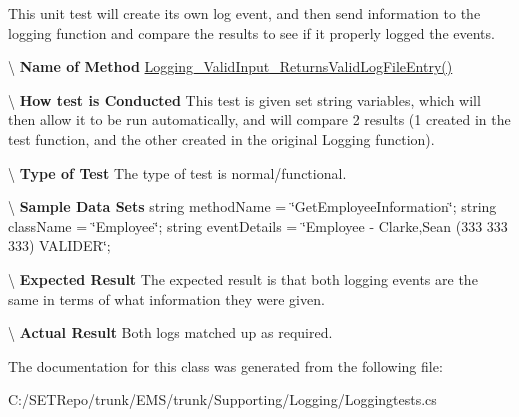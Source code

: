 This unit test will create it\textquotesingle{}s own log event, and then send information to the logging function and compare the results to see if it properly logged the events. 

\textbackslash{} {\bfseries  Name of Method} \hyperlink{class_loggingtests_1_1_loggingtests_a4a436491d1f3aed0e4402d053bed886d}{Logging\+\_\+\+Valid\+Input\+\_\+\+Returns\+Valid\+Log\+File\+Entry()}

\textbackslash{} {\bfseries  How test is Conducted} This test is given set string variables, which will then allow it to be run automatically, and will compare 2 results (1 created in the test function, and the other created in the original Logging function).

\textbackslash{} {\bfseries  Type of Test} The type of test is normal/functional.

\textbackslash{} {\bfseries  Sample Data Sets} string method\+Name = \char`\"{}\+Get\+Employee\+Information\char`\"{}; string class\+Name = \char`\"{}\+Employee\char`\"{}; string event\+Details = \char`\"{}\+Employee -\/ Clarke,\+Sean (333 333 333) V\+A\+L\+I\+D\+E\+R\char`\"{};

\textbackslash{} {\bfseries  Expected Result} The expected result is that both logging events are the same in terms of what information they were given.

\textbackslash{} {\bfseries  Actual Result} Both logs matched up as required. 

The documentation for this class was generated from the following file\+:\begin{DoxyCompactItemize}
\item 
C\+:/\+S\+E\+T\+Repo/trunk/\+E\+M\+S/trunk/\+Supporting/\+Logging/Loggingtests.\+cs\end{DoxyCompactItemize}
